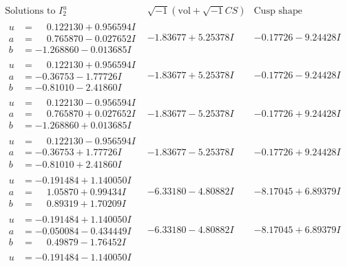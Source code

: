 \documentclass[1p]{elsarticle_modified}
\theoremstyle{definition}
\newcommand{\I}{\sqrt{-1}}
\begin{document}
$$\begin{array}{c|c|c}  
\text{Solutions to }I^u_{2}& \I (\text{vol} + \sqrt{-1}CS) & \text{Cusp shape}\\
 \hline 
\begin{aligned}
u &= \phantom{-}0.122130 + 0.956594 I \\
a &= \phantom{-}0.765870 - 0.027652 I \\
b &= -1.268860 - 0.013685 I\end{aligned}
 & -1.83677 + 5.25378 I & -0.17726 - 9.24428 I \\ \hline\begin{aligned}
u &= \phantom{-}0.122130 + 0.956594 I \\
a &= -0.36753 - 1.77726 I \\
b &= -0.81010 - 2.41860 I\end{aligned}
 & -1.83677 + 5.25378 I & -0.17726 - 9.24428 I \\ \hline\begin{aligned}
u &= \phantom{-}0.122130 - 0.956594 I \\
a &= \phantom{-}0.765870 + 0.027652 I \\
b &= -1.268860 + 0.013685 I\end{aligned}
 & -1.83677 - 5.25378 I & -0.17726 + 9.24428 I \\ \hline\begin{aligned}
u &= \phantom{-}0.122130 - 0.956594 I \\
a &= -0.36753 + 1.77726 I \\
b &= -0.81010 + 2.41860 I\end{aligned}
 & -1.83677 - 5.25378 I & -0.17726 + 9.24428 I \\ \hline\begin{aligned}
u &= -0.191484 + 1.140050 I \\
a &= \phantom{-}1.05870 + 0.99434 I \\
b &= \phantom{-}0.89319 + 1.70209 I\end{aligned}
 & -6.33180 - 4.80882 I & -8.17045 + 6.89379 I \\ \hline\begin{aligned}
u &= -0.191484 + 1.140050 I \\
a &= -0.050084 - 0.434449 I \\
b &= \phantom{-}0.49879 - 1.76452 I\end{aligned}
 & -6.33180 - 4.80882 I & -8.17045 + 6.89379 I \\ \hline\begin{aligned}
u &= -0.191484 - 1.140050 I \\

\end{aligned}
\end{array}$$
\end{document}
